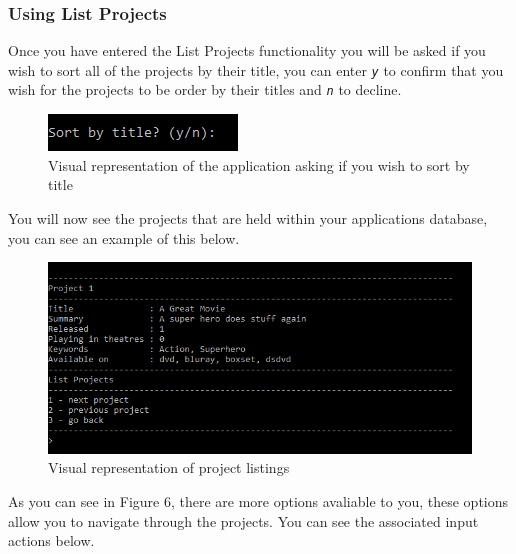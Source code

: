 \documentclass[
  english,
  a4paper,
,tablecaptionabove
]{scrartcl}
\begin{document}
\newpage

\hypertarget{using-list-projects}{%
\subsubsection{Using List Projects}\label{using-list-projects}}

Once you have entered the List Projects functionality you will be asked
if you wish to sort all of the projects by their title, you can enter
\emph{\texttt{y}} to confirm that you wish for the projects to be order
by their titles and \emph{\texttt{n}} to decline.

\begin{figure}
\centering
\includegraphics{images/user-guide/view-mode/sort-by-title.png}
\caption{Visual representation of the application asking if you wish to
sort by title}
\end{figure}

You will now see the projects that are held within your applications
database, you can see an example of this below.

\begin{figure}
\centering
\includegraphics{images/user-guide/view-mode/listed-projects.png}
\caption{Visual representation of project listings}
\end{figure}

As you can see in Figure 6, there are more options avaliable to you,
these options allow you to navigate through the projects. You can see
the associated input actions below.
\end{document}
